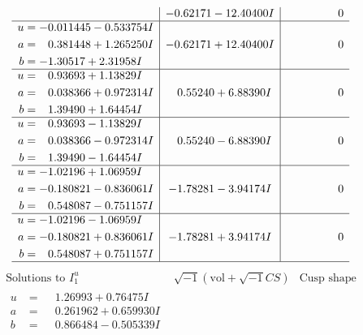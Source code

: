 \documentclass[1p]{elsarticle_modified}
\theoremstyle{definition}
\newcommand{\I}{\sqrt{-1}}
\begin{document}
$$\begin{array}{c|c|c}
 & -0.62171 - 12.40400 I & \phantom{-0.000000 } 0 \\ \hline\begin{aligned}
u &= -0.011445 - 0.533754 I \\
a &= \phantom{-}0.381448 + 1.265250 I \\
b &= -1.30517 + 2.31958 I\end{aligned}
 & -0.62171 + 12.40400 I & \phantom{-0.000000 } 0 \\ \hline\begin{aligned}
u &= \phantom{-}0.93693 + 1.13829 I \\
a &= \phantom{-}0.038366 + 0.972314 I \\
b &= \phantom{-}1.39490 + 1.64454 I\end{aligned}
 & \phantom{-}0.55240 + 6.88390 I & \phantom{-0.000000 } 0 \\ \hline\begin{aligned}
u &= \phantom{-}0.93693 - 1.13829 I \\
a &= \phantom{-}0.038366 - 0.972314 I \\
b &= \phantom{-}1.39490 - 1.64454 I\end{aligned}
 & \phantom{-}0.55240 - 6.88390 I & \phantom{-0.000000 } 0 \\ \hline\begin{aligned}
u &= -1.02196 + 1.06959 I \\
a &= -0.180821 - 0.836061 I \\
b &= \phantom{-}0.548087 - 0.751157 I\end{aligned}
 & -1.78281 - 3.94174 I & \phantom{-0.000000 } 0 \\ \hline\begin{aligned}
u &= -1.02196 - 1.06959 I \\
a &= -0.180821 + 0.836061 I \\
b &= \phantom{-}0.548087 + 0.751157 I\end{aligned}
 & -1.78281 + 3.94174 I & \phantom{-0.000000 } 0\\
 \hline 
 \end{array}$$\newpage$$\begin{array}{c|c|c}  
\text{Solutions to }I^u_{1}& \I (\text{vol} + \sqrt{-1}CS) & \text{Cusp shape}\\
 \hline 
\begin{aligned}
u &= \phantom{-}1.26993 + 0.76475 I \\
a &= \phantom{-}0.261962 + 0.659930 I \\
b &= \phantom{-}0.866484 - 0.505339 I\end{aligned}

\end{array}$$
\end{document}
